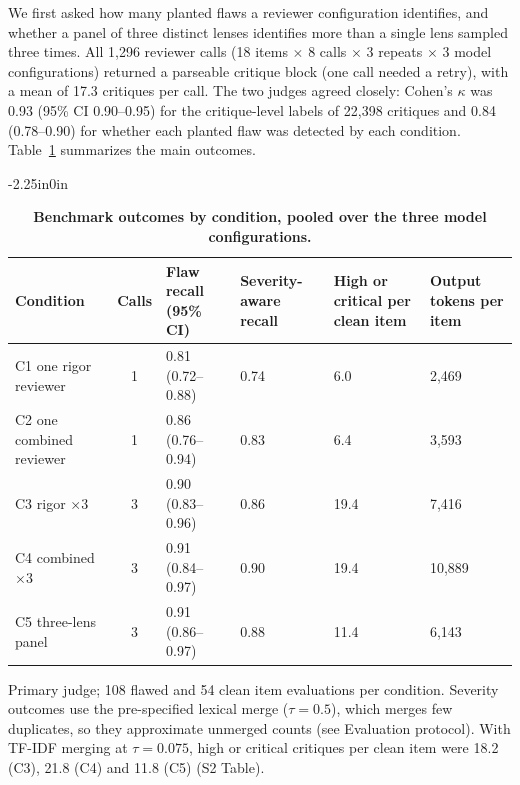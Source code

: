 \documentclass[10pt,letterpaper]{article}
\begin{document}
We first asked how many planted flaws a reviewer configuration identifies, and whether a panel of three distinct lenses identifies more than a single lens sampled three times. All 1,296 reviewer calls (18 items $\times$ 8 calls $\times$ 3 repeats $\times$ 3 model configurations) returned a parseable critique block (one call needed a retry), with a mean of 17.3 critiques per call. The two judges agreed closely: Cohen's $\kappa$ was 0.93 (95\% CI 0.90--0.95) for the critique-level labels of 22,398 critiques and 0.84 (0.78--0.90) for whether each planted flaw was detected by each condition. Table~\ref{table_benchmark} summarizes the main outcomes.

\begin{table}[!ht]
\begin{adjustwidth}{-2.25in}{0in}
\centering
\caption{{\bf Benchmark outcomes by condition, pooled over the three model configurations.}}
\label{table_benchmark}
\begin{tabular}{@{}p{3.3cm}cp{2.3cm}p{1.8cm}p{1.9cm}p{1.6cm}@{}}
\hline
\textbf{Condition} & \textbf{Calls} & \textbf{Flaw recall (95\% CI)} & \textbf{Severity-aware recall} & \textbf{High or critical per clean item} & \textbf{Output tokens per item} \\ \hline
C1 one rigor reviewer & 1 & 0.81 (0.72--0.88) & 0.74 & 6.0 & 2,469 \\
C2 one combined reviewer & 1 & 0.86 (0.76--0.94) & 0.83 & 6.4 & 3,593 \\
C3 rigor $\times$3 & 3 & 0.90 (0.83--0.96) & 0.86 & 19.4 & 7,416 \\
C4 combined $\times$3 & 3 & 0.91 (0.84--0.97) & 0.90 & 19.4 & 10,889 \\
C5 three-lens panel & 3 & 0.91 (0.86--0.97) & 0.88 & 11.4 & 6,143 \\ \hline
\end{tabular}
\begin{flushleft} Primary judge; 108 flawed and 54 clean item evaluations per condition. Severity outcomes use the pre-specified lexical merge ($\tau=0.5$), which merges few duplicates, so they approximate unmerged counts (see Evaluation protocol). With TF-IDF merging at $\tau=0.075$, high or critical critiques per clean item were 18.2 (C3), 21.8 (C4) and 11.8 (C5) (S2 Table).
\end{flushleft}
\end{adjustwidth}
\end{table}
\end{document}
